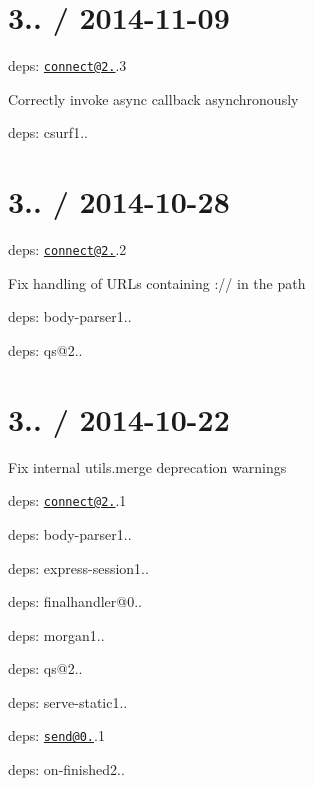 \section*{3.. / 2014-\/11-\/09 }


\begin{DoxyItemize}
\item deps\+: \href{mailto:connect@2.27}{\tt connect@2.}.3
\begin{DoxyItemize}
\item Correctly invoke async callback asynchronously
\item deps\+: csurf1..
\end{DoxyItemize}
\end{DoxyItemize}

\section*{3.. / 2014-\/10-\/28 }


\begin{DoxyItemize}
\item deps\+: \href{mailto:connect@2.27}{\tt connect@2.}.2
\begin{DoxyItemize}
\item Fix handling of U\+R\+Ls containing {\ttfamily \+://} in the path
\item deps\+: body-\/parser1..
\item deps\+: qs@2..
\end{DoxyItemize}
\end{DoxyItemize}

\section*{3.. / 2014-\/10-\/22 }


\begin{DoxyItemize}
\item Fix internal {\ttfamily utils.\+merge} deprecation warnings
\item deps\+: \href{mailto:connect@2.27}{\tt connect@2.}.1
\begin{DoxyItemize}
\item deps\+: body-\/parser1..
\item deps\+: express-\/session1..
\item deps\+: finalhandler@0..
\item deps\+: morgan1..
\item deps\+: qs@2..
\item deps\+: serve-\/static1..
\end{DoxyItemize}
\item deps\+: \href{mailto:send@0.10}{\tt send@0.}.1
\begin{DoxyItemize}
\item deps\+: on-\/finished2..
\end{DoxyItemize}
\end{DoxyItemize}

